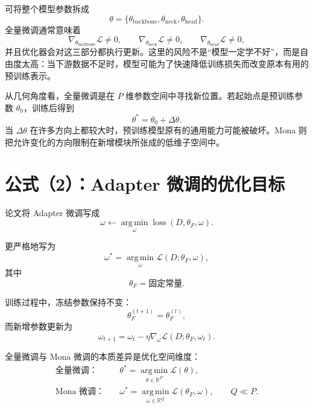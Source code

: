 \documentclass[UTF8,12pt,a4paper,fontset=none]{ctexart}
\newcommand{\Loss}{\mathcal{L}}
\newcommand{\R}{\mathbb{R}}
\newcommand{\argmin}{\operatorname*{arg\,min}}
\begin{document}
可将整个模型参数拆成
\begin{equation}
 \theta=\{\theta_{\mathrm{backbone}},\theta_{\mathrm{neck}},\theta_{\mathrm{head}}\}.
\end{equation}
全量微调通常意味着
\begin{equation}
 \nabla_{\theta_{\mathrm{backbone}}}\Loss\neq0,\qquad
 \nabla_{\theta_{\mathrm{neck}}}\Loss\neq0,\qquad
 \nabla_{\theta_{\mathrm{head}}}\Loss\neq0,
\end{equation}
并且优化器会对这三部分都执行更新。这里的风险不是“模型一定学不好”，而是自由度太高：当下游数据不足时，模型可能为了快速降低训练损失而改变原本有用的预训练表示。

从几何角度看，全量微调是在 $P$ 维参数空间中寻找新位置。若起始点是预训练参数 $\theta_0$，训练后得到
\begin{equation}
 \theta^\ast=\theta_0+\Delta\theta.
\end{equation}
当 $\Delta\theta$ 在许多方向上都较大时，预训练模型原有的通用能力可能被破坏。Mona 则把允许变化的方向限制在新增模块所张成的低维子空间中。

\section{公式（2）：Adapter 微调的优化目标}

论文将 Adapter 微调写成
\begin{equation}
 \omega\leftarrow\argmin_{\omega}\operatorname{loss}(D,\theta_F,\omega).
 \tag{2}
\end{equation}

更严格地写为
\begin{equation}
 \omega^\ast
 =\argmin_{\omega}\Loss(D;\theta_F,\omega),
\end{equation}
其中
\begin{equation}
 \theta_F=\text{固定常量}.
\end{equation}

训练过程中，冻结参数保持不变：
\begin{equation}
 \theta_F^{(t+1)}=\theta_F^{(t)},
\end{equation}
而新增参数更新为
\begin{equation}
 \omega_{t+1}
 =\omega_t-\eta\nabla_{\omega}
 \Loss(D;\theta_F,\omega_t).
\end{equation}

全量微调与 Mona 微调的本质差异是优化空间维度：
\begin{align}
 \text{全量微调：}\quad
 &\theta^\ast
 =\argmin_{\theta\in\R^P}\Loss(\theta),\\
 \text{Mona 微调：}\quad
 &\omega^\ast
 =\argmin_{\omega\in\R^Q}\Loss(\theta_F,\omega),
 \qquad Q\ll P.
\end{align}
\end{document}

